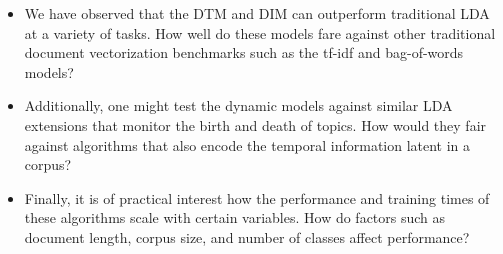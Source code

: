 \begin{itemize}

\item We have observed that the DTM and DIM can outperform traditional LDA at a variety of tasks. How well do these models fare against other traditional document vectorization benchmarks such as the tf-idf and bag-of-words models?

\item Additionally, one might test the dynamic models against similar LDA extensions that monitor the birth and death of topics. How would they fair against algorithms that also encode the temporal information latent in a corpus?

\item Finally, it is of practical interest how the performance and training times of these algorithms scale with certain variables. How do factors such as document length, corpus size, and number of classes affect performance?

\end{itemize}


